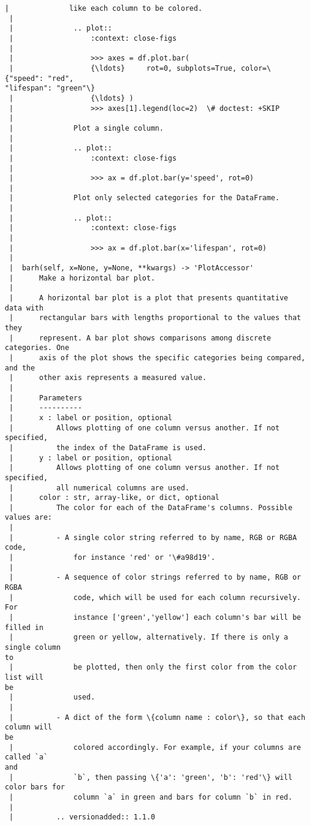 \documentclass[11pt]{article}
\begin{document}
\begin{Verbatim}[commandchars=\\\{\}]
 |              like each column to be colored.
 |
 |              .. plot::
 |                  :context: close-figs
 |
 |                  >>> axes = df.plot.bar(
 |                  {\ldots}     rot=0, subplots=True, color=\{"speed": "red",
"lifespan": "green"\}
 |                  {\ldots} )
 |                  >>> axes[1].legend(loc=2)  \# doctest: +SKIP
 |
 |              Plot a single column.
 |
 |              .. plot::
 |                  :context: close-figs
 |
 |                  >>> ax = df.plot.bar(y='speed', rot=0)
 |
 |              Plot only selected categories for the DataFrame.
 |
 |              .. plot::
 |                  :context: close-figs
 |
 |                  >>> ax = df.plot.bar(x='lifespan', rot=0)
 |
 |  barh(self, x=None, y=None, **kwargs) -> 'PlotAccessor'
 |      Make a horizontal bar plot.
 |
 |      A horizontal bar plot is a plot that presents quantitative data with
 |      rectangular bars with lengths proportional to the values that they
 |      represent. A bar plot shows comparisons among discrete categories. One
 |      axis of the plot shows the specific categories being compared, and the
 |      other axis represents a measured value.
 |
 |      Parameters
 |      ----------
 |      x : label or position, optional
 |          Allows plotting of one column versus another. If not specified,
 |          the index of the DataFrame is used.
 |      y : label or position, optional
 |          Allows plotting of one column versus another. If not specified,
 |          all numerical columns are used.
 |      color : str, array-like, or dict, optional
 |          The color for each of the DataFrame's columns. Possible values are:
 |
 |          - A single color string referred to by name, RGB or RGBA code,
 |              for instance 'red' or '\#a98d19'.
 |
 |          - A sequence of color strings referred to by name, RGB or RGBA
 |              code, which will be used for each column recursively. For
 |              instance ['green','yellow'] each column's bar will be filled in
 |              green or yellow, alternatively. If there is only a single column
to
 |              be plotted, then only the first color from the color list will
be
 |              used.
 |
 |          - A dict of the form \{column name : color\}, so that each column will
be
 |              colored accordingly. For example, if your columns are called `a`
and
 |              `b`, then passing \{'a': 'green', 'b': 'red'\} will color bars for
 |              column `a` in green and bars for column `b` in red.
 |
 |          .. versionadded:: 1.1.0

\end{Verbatim}
\end{document}
